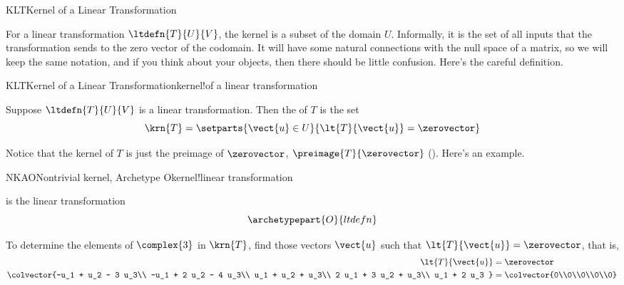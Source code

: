 %
\begin{subsect}{KLT}{Kernel of a Linear Transformation}
%
\begin{para}For a linear transformation $\ltdefn{T}{U}{V}$, the kernel is a subset of the domain $U$.  Informally, it is the set of all inputs that the transformation sends to the zero vector of the codomain.  It will have some natural connections with the null space of a matrix, so we will keep the same notation, and if you think about your objects, then there should be little confusion.  Here's the careful definition.\end{para}
%
\begin{definition}{KLT}{Kernel of a Linear Transformation}{kernel!of a linear transformation}
\begin{para}Suppose $\ltdefn{T}{U}{V}$ is a linear transformation.  Then the  of $T$ is the set
%
\begin{equation*}
\krn{T}=\setparts{\vect{u}\in U}{\lt{T}{\vect{u}}=\zerovector}
\end{equation*}
\end{para}
%
\end{definition}
%
\begin{para}Notice that the kernel of $T$ is just the preimage of $\zerovector$, $\preimage{T}{\zerovector}$ ().  Here's an example.\end{para}
%
\begin{example}{NKAO}{Nontrivial kernel, Archetype O}{kernel!linear transformation}
\begin{para} is the linear transformation
%
\begin{equation*}
\archetypepart{O}{ltdefn}\end{equation*}
\end{para}
%
\begin{para}To determine the elements of $\complex{3}$ in $\krn{T}$, find those vectors $\vect{u}$ such that $\lt{T}{\vect{u}}=\zerovector$, that is,
%
\begin{align*}
\lt{T}{\vect{u}}&=\zerovector\\
\colvector{-u_1 + u_2 - 3 u_3\\
-u_1 + 2 u_2 - 4 u_3\\
u_1 + u_2 + u_3\\
2 u_1 + 3 u_2 + u_3\\
u_1 + 2 u_3
}
&=
\colvector{0\\0\\0\\0\\0}

\end{align*}
\end{para}
\end{example}
\end{subsect}
